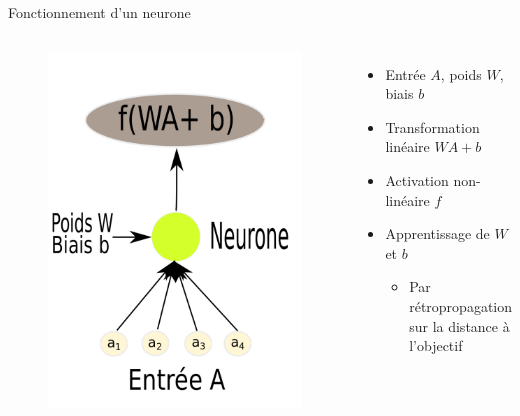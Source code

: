 \documentclass{beamer}
\begin{document}
\begin{frame}{Fonctionnement d'un neurone}

  \begin{columns}
    \begin{figure}
      \centering
      \includegraphics[scale=0.17]{../Figures/Neuron}
    \end{figure}

    \begin{itemize}
    \item Entrée $A$, poids $W$, biais $b$
    \item Transformation linéaire $WA + b$
    \item Activation non-linéaire $f$
    \item Apprentissage de $W$ et $b$
      \begin{itemize}
      \item Par rétropropagation sur la distance à l'objectif
      \end{itemize}
    \end{itemize}
  \end{columns}

\end{frame}
\end{document}
